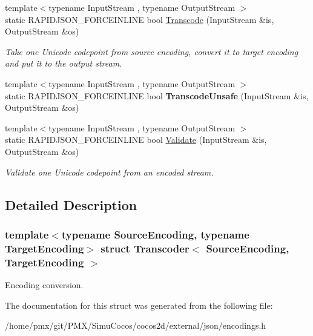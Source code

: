 \begin{DoxyCompactItemize}
{\footnotesize template$<$typename Input\+Stream , typename Output\+Stream $>$ }\\static R\+A\+P\+I\+D\+J\+S\+O\+N\+\_\+\+F\+O\+R\+C\+E\+I\+N\+L\+I\+NE bool \hyperlink{structTranscoder_a0ea2edfe35784ebf1063921d2bd5fb66}{Transcode} (Input\+Stream \&is, Output\+Stream \&os)
\begin{DoxyCompactList}\small\item\em Take one Unicode codepoint from source encoding, convert it to target encoding and put it to the output stream. \end{DoxyCompactList}\item 
\mbox{\label{structTranscoder_a16345a912c679b2ea197328eb1444f82}} 
{\footnotesize template$<$typename Input\+Stream , typename Output\+Stream $>$ }\\static R\+A\+P\+I\+D\+J\+S\+O\+N\+\_\+\+F\+O\+R\+C\+E\+I\+N\+L\+I\+NE bool {\bfseries Transcode\+Unsafe} (Input\+Stream \&is, Output\+Stream \&os)
\item 
\mbox{\label{structTranscoder_a8a64aa837f7962894a99f63232472543}} 
{\footnotesize template$<$typename Input\+Stream , typename Output\+Stream $>$ }\\static R\+A\+P\+I\+D\+J\+S\+O\+N\+\_\+\+F\+O\+R\+C\+E\+I\+N\+L\+I\+NE bool \hyperlink{structTranscoder_a8a64aa837f7962894a99f63232472543}{Validate} (Input\+Stream \&is, Output\+Stream \&os)
\begin{DoxyCompactList}\small\item\em Validate one Unicode codepoint from an encoded stream. \end{DoxyCompactList}\end{DoxyCompactItemize}


\subsection{Detailed Description}
\subsubsection*{template$<$typename Source\+Encoding, typename Target\+Encoding$>$\newline
struct Transcoder$<$ Source\+Encoding, Target\+Encoding $>$}

Encoding conversion. 

The documentation for this struct was generated from the following file\+:\begin{DoxyCompactItemize}
\item 
/home/pmx/git/\+P\+M\+X/\+Simu\+Cocos/cocos2d/external/json/encodings.\+h\end{DoxyCompactItemize}
